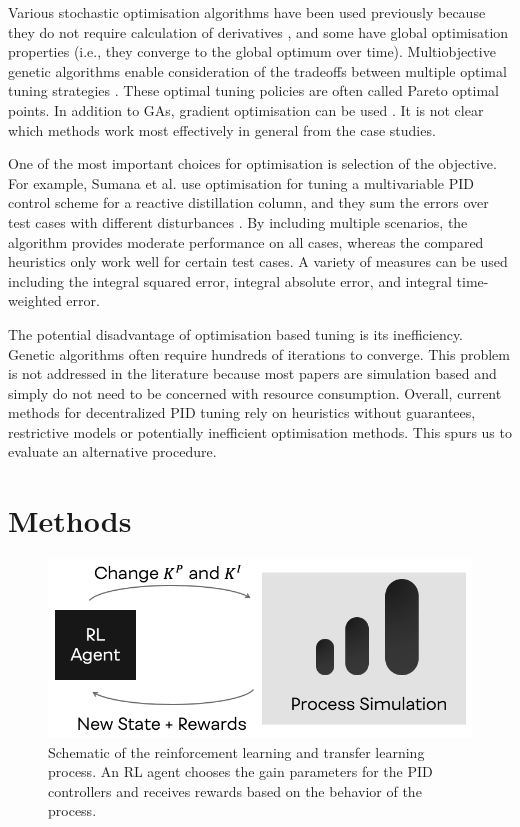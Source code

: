 Various stochastic optimisation algorithms have been used previously because they do not require calculation of derivatives \cite{Sumana2010, Ganesh2010, Behroozsarand2012}, and some have global optimisation properties (i.e., they converge to the global optimum over time). Multiobjective genetic algorithms enable consideration of the tradeoffs between multiple optimal tuning strategies \cite{Behroozsarand2012, Pajares2019}. These optimal tuning policies are often called Pareto optimal points. In addition to GAs, gradient optimisation can be used \cite{Sommer2011}. It is not clear which methods work most effectively in general from the case studies.

One of the most important choices for optimisation is selection of the objective. For example, Sumana et al. use optimisation for tuning a multivariable PID control scheme for a reactive distillation column, and they sum the errors over  test cases with different disturbances \cite{Sumana2010}. By including multiple scenarios, the algorithm provides moderate performance on all cases, whereas the compared heuristics only work well for certain test cases. A variety of measures can be used including the integral squared error, integral absolute error, and integral time-weighted error. 

The potential disadvantage of optimisation based tuning is its inefficiency. Genetic algorithms often require hundreds of iterations to converge. This problem is not addressed in the literature because most papers are simulation based and simply do not need to be concerned with resource consumption. Overall, current methods for decentralized PID tuning rely on heuristics without guarantees, restrictive models or potentially inefficient optimisation methods.  This spurs us to evaluate an alternative procedure.

\section{Methods}
\begin{figure}
  \includegraphics[width=\linewidth]{gfx/Chapter05/rl_tuning_loop.png}
  \caption{Schematic of the reinforcement learning and transfer learning process. An RL agent chooses the gain parameters for the PID controllers and receives rewards based on the behavior of the process.}
  \label{immalabel}
\end{figure}

